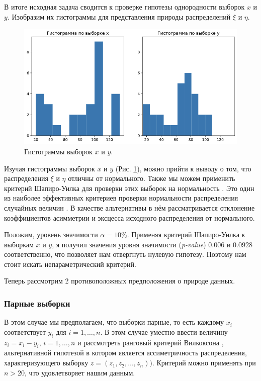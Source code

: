 \documentclass[12pt, fleqn, titlepage]{article}
\begin{document}
    В итоге исходная задача сводится к проверке гипотезы однородности выборок $x$ и $y$. 
    Изобразим их гистограммы для представления природы распределений $\xi$ и $\eta$.

    \begin{figure}[ht]
        \centering
        \includegraphics[scale=0.4]{pics/dists.png}
        \caption{Гистограммы выборок $x$ и $y$.}
        \label{dists}
    \end{figure}

    Изучая гистограммы выборок $x$ и $y$ (Рис. \ref{dists}), можно прийти к выводу о том, что распределения $\xi$ и $\eta$ отличны от нормального. 
    Также мы можем применить критерий Шапиро-Уилка для проверки этих выборок на нормальность \cite{shapiro}. 
    Это один из наиболее эффективных критериев проверки нормальности распределения случайных величин \cite{shapiro_power, kobzar2012asm}.
    В качестве альтернативы в нём рассматривается отклонение коэффициентов асимметрии и эксцесса 
    исходного распределения от нормального.
    
    Положим, уровень значимости $\alpha = 10\%$. Применяя критерий Шапиро-Уилка к выборкам $x$ и $y$, 
    я получил значения уровня значимости (\textit{p-value}) $0.006$ и $0.0928$ соответственно, что позволяет нам отвергнуть нулевую гипотезу. 
    Поэтому нам стоит искать непараметрический критерий.

    Теперь рассмотрим 2 противоположных предположения о природе данных.

    \subsubsection{Парные выборки}

    В этом случае мы предполагаем, что выборки парные, 
    то есть каждому $x_i$ соответствует $y_i$ для $i = 1, \dots , n$. В этом случае уместно ввести 
    величину $z_i = x_i - y_i$, $i = 1, \dots , n$ и рассмотреть ранговый критерий Вилкоксона \cite{wilcoxon}, альтернативной 
    гипотезой в котором является ассиметричность распределения, характеризующего выборку $z = (z_1, z_2, \dots , z_n))$. 
    Критерий можно применять при $n > 20$, что удовлетворяет нашим данным.
\end{document}
